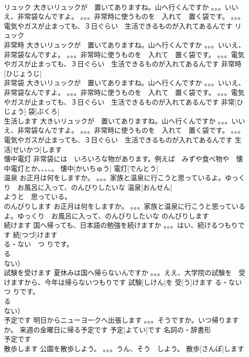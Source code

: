 \documentclass[8pt]{extreport}
\begin{document}
\begin{CJK}{UTF8}{min}
\\	リュック	大きいリュックが　置いてありますね。山へ行くんですか 。。。いいえ、非常袋なんですよ。 。。。非常時に使うものを　入れて　置く袋です。 。。。電気やガスが止まっても、３日ぐらい　生活できるものが入れてあるんです	リュック					
\\	非常時	大きいリュックが　置いてありますね。山へ行くんですか 。。。いいえ、非常袋なんですよ。 。。。非常時に使うものを　入れて　置く袋です。 。。。電気やガスが止まっても、３日ぐらい　生活できるものが入れてあるんです	非常時[ひじょうじ]					
\\	非常袋	大きいリュックが　置いてありますね。山へ行くんですか 。。。いいえ、非常袋なんですよ。 。。。非常時に使うものを　入れて　置く袋です。 。。。電気やガスが止まっても、３日ぐらい　生活できるものが入れてあるんです	非常[ひじょう] 袋[ぶくろ]					
\\	生活します	大きいリュックが　置いてありますね。山へ行くんですか 。。。いいえ、非常袋なんですよ。 。。。非常時に使うものを　入れて　置く袋です。 。。。電気やガスが止まっても、３日ぐらい　生活できるものが入れてあるんです	生活[せいかつ]します					
\\	懐中電灯	非常袋には　いろいろな物があります。例えば　みずや食べ物や　懐中電灯とか、、、、。	懐中[かいちゅう] 電灯[でんとう]			
\\	温泉	お正月は何をしますか。 。。。家族と温泉に行こうと思っているよ。ゆっくり　お風呂に入って、のんびりしたいな	温泉[おんせん]			
\\	ようと　思っている。
\\	のんびりします	お正月は何をしますか。 。。。家族と温泉に行こうと思っているよ。ゆっくり　お風呂に入って、のんびりしたいな	のんびりします			
\\	続けます	国へ帰っても、日本語の勉強を続けますか 。。。はい、続けるつもりです	続[つづ]けます			
\\	る・ない　つ りです。
\\	る
\\	ない）
\\	試験を受けます	夏休みは国へ帰らないんですか 。。。ええ、大学院の試験を　受けますから、今年は帰らないつもりです	試験[しけん]を 受[う]けます				る・ない　つ りです。
\\	る
\\	ない）
\\	予定です	明日からニューヨークへ出張します 。。。そうですか。いつ帰りますか。 来週の金曜日に帰る予定です	予定[よてい]です				名詞の・辞書形
\\	予定です
\\	散歩します	公園を散歩しよう。 。。。うん、そう　しよう。	散歩[さんぽ]します				

\end{CJK}
\end{document}
